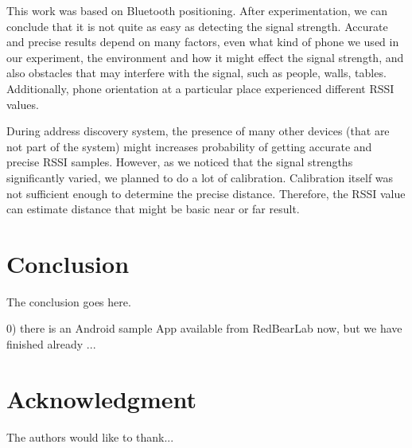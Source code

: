 \documentclass[conference,a4paper]{../../sty/IEEEtran}
\begin{document}
This work was based on Bluetooth positioning. After experimentation, we can conclude that it is not quite as easy as detecting the signal strength. Accurate and precise results depend on many factors, even what kind of phone we used in our experiment, the environment and how it might effect the signal strength, and also obstacles that may interfere with the signal, such as people, walls, tables. Additionally, phone orientation at a particular place experienced different RSSI values.

During address discovery system, the presence of many other devices (that are not part of the system) might 
increases probability of getting accurate and precise RSSI samples. However, as we noticed that the signal strengths significantly varied, we planned to do a lot of calibration. Calibration itself was not sufficient enough to determine the precise distance. Therefore, the RSSI value can estimate distance that might be basic near or far result. 

\section{Conclusion}
The conclusion goes here.

0) there is an Android sample App available from RedBearLab now, but we have finished already ...




\section*{Acknowledgment}


The authors would like to thank...\cite{IEEEhowto:IEEEtranpage}





\nocite*{}


\end{document}
